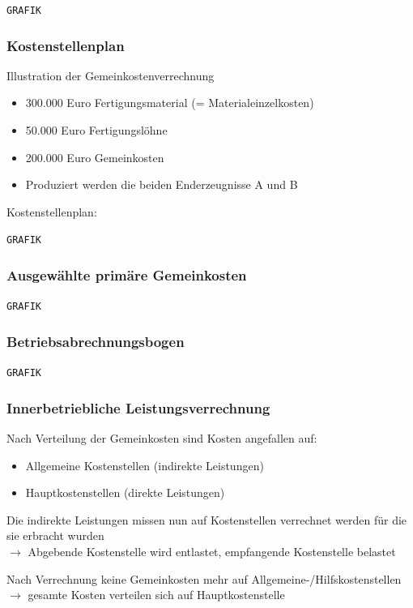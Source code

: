 \documentclass[a4paper,11pt, twoside]{article}
\begin{document}
\texttt{GRAFIK}

\subsubsection*{Kostenstellenplan}

Illustration der Gemeinkostenverrechnung
\begin{itemize}
	\item 300.000 Euro Fertigungsmaterial (= Materialeinzelkosten)
	\item 50.000 Euro Fertigungslöhne
	\item 200.000 Euro Gemeinkosten
	\item Produziert werden die beiden Enderzeugnisse A und B
\end{itemize} 

Kostenstellenplan:


\texttt{GRAFIK}


\subsubsection*{Ausgewählte primäre Gemeinkosten}

\texttt{GRAFIK}

\subsubsection*{Betriebsabrechnungsbogen}

\texttt{GRAFIK}

\subsubsection*{Innerbetriebliche Leistungsverrechnung}
Nach Verteilung der Gemeinkosten sind Kosten angefallen auf:
\begin{itemize}
	\item Allgemeine Kostenstellen (indirekte Leistungen)
	\item Hauptkostenstellen (direkte Leistungen)
\end{itemize}

Die indirekte Leistungen missen nun auf Kostenstellen verrechnet werden für die sie erbracht wurden\\
$\rightarrow$ Abgebende Kostenstelle wird entlastet, empfangende Kostenstelle belastet

Nach Verrechnung keine Gemeinkosten mehr auf Allgemeine-/Hilfskostenstellen\\
$\rightarrow$ gesamte Kosten verteilen sich auf Hauptkostenstelle
\end{document}
